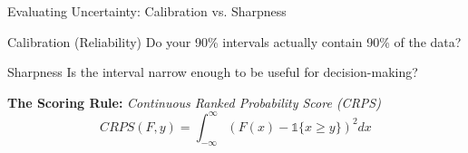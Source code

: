 \begin{frame}{Evaluating Uncertainty: Calibration vs. Sharpness}
    \begin{block}{Calibration (Reliability)}
        Do your 90\% intervals actually contain 90\% of the data?
    \end{block}
    \begin{block}{Sharpness}
        Is the interval narrow enough to be useful for decision-making?
    \end{block}
    \textbf{The Scoring Rule:} \textit{Continuous Ranked Probability Score (CRPS)}
    \[ CRPS(F, y) = \int_{-\infty}^{\infty} (F(x) - \mathbb{1}\{x \geq y\})^2 dx \]
\end{frame}